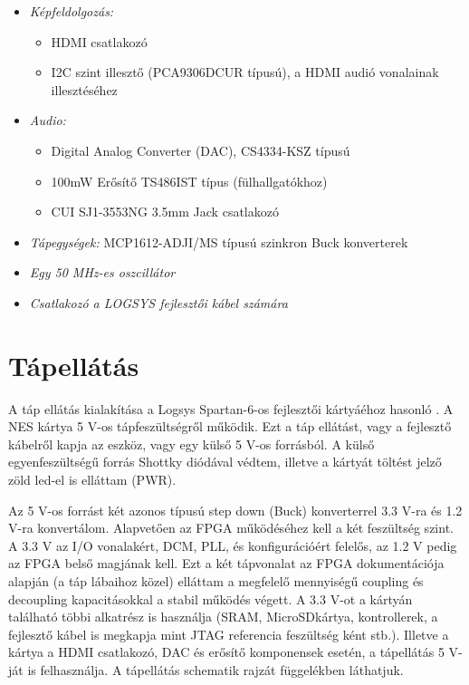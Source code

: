 \begin{itemize}
\begin{itemize}
		\end{itemize}	
	\item \emph{Képfeldolgozás:}
		\begin{itemize}
			\item HDMI csatlakozó 
			\item I2C szint illesztő (PCA9306DCUR típusú), a HDMI audió vonalainak illesztéséhez 
		\end{itemize}
	\item \emph{Audio:}
		\begin{itemize}
			\item Digital Analog Converter (DAC), CS4334-KSZ típusú  
			\item 100mW Erősítő TS486IST típus (fülhallgatókhoz)
			\item CUI SJ1-3553NG 3.5mm Jack csatlakozó
		\end{itemize}
	\item \emph{Tápegységek:} MCP1612-ADJI/MS típusú szinkron Buck konverterek
	\item \emph{Egy 50 MHz-es oszcillátor} 
	\item \emph{Csatlakozó a LOGSYS fejlesztői kábel számára} 
\end{itemize}
	
\section{Tápellátás}
	
	A táp ellátás kialakítása a Logsys Spartan-6-os fejlesztői kártyáéhoz hasonló \cite{spatan6}. A NES kártya 5 V-os tápfeszültségről működik. Ezt a táp ellátást, vagy a fejlesztő kábelről kapja az eszköz, vagy egy külső 5 V-os forrásból. A külső egyenfeszültségű forrás Shottky diódával védtem, illetve a kártyát töltést jelző zöld led-el is elláttam (PWR). 
	
	Az 5 V-os forrást két azonos típusú step down (Buck) konverterrel 3.3 V-ra és 1.2 V-ra konvertálom. Alapvetően az FPGA működéséhez kell a két feszültség szint. A 3.3 V az I/O vonalakért, DCM, PLL, és konfigurációért felelős, az 1.2 V pedig az FPGA belső magjának kell. Ezt a két tápvonalat az FPGA dokumentációja alapján (a táp lábaihoz közel) elláttam a megfelelő mennyiségű coupling és decoupling kapacitásokkal a stabil működés végett. A 3.3 V-ot a kártyán található többi alkatrész is használja (SRAM, MicroSDkártya, kontrollerek, a fejlesztő kábel is megkapja mint JTAG referencia feszültség ként stb.). Illetve a kártya a HDMI csatlakozó, DAC és erősítő komponensek esetén, a tápellátás 5 V-ját is felhasználja. A tápellátás schematik rajzát  függelékben láthatjuk. 
	 

